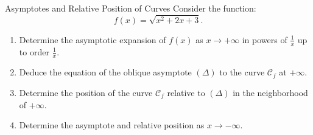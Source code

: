\begin{exercise}{Asymptotes and Relative Position of Curves}
Consider the function:
\[
f(x) = \sqrt{x^2 + 2x + 3}.
\]
\begin{enumerate}[leftmargin=1.5em,itemsep=2pt]
  \item Determine the asymptotic expansion of $f(x)$ as $x \to +\infty$ in powers of $\frac{1}{x}$ up to order $\frac{1}{x}$.
  \item Deduce the equation of the oblique asymptote $(\Delta)$ to the curve $\mathcal{C}_f$ at $+\infty$.
  \item Determine the position of the curve $\mathcal{C}_f$ relative to $(\Delta)$ in the neighborhood of $+\infty$.
  \item Determine the asymptote and relative position as $x \to -\infty$.
\end{enumerate}
\end{exercise}

\begin{tabletworkspace}[5.0cm]
\end{tabletworkspace}

